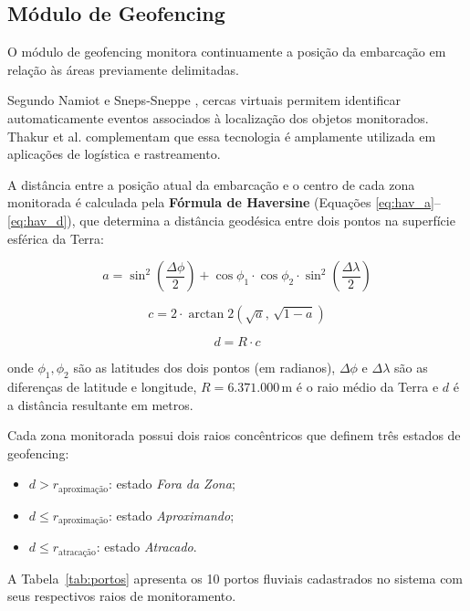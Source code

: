 \documentclass[12pt]{article}
\begin{document}
\subsection{Módulo de Geofencing}
O módulo de geofencing monitora continuamente a posição da embarcação em relação às áreas previamente delimitadas.

Segundo Namiot e Sneps-Sneppe \cite{namiot2013geofencing}, cercas virtuais permitem identificar automaticamente eventos associados à localização dos objetos monitorados. Thakur et al. \cite{thakur2020geofencing} complementam que essa tecnologia é amplamente utilizada em aplicações de logística e rastreamento.

A distância entre a posição atual da embarcação e o centro de cada zona monitorada é calculada pela \textbf{Fórmula de Haversine} (Equações \ref{eq:hav_a}--\ref{eq:hav_d}), que determina a distância geodésica entre dois pontos na superfície esférica da Terra:

\begin{equation}
\label{eq:hav_a}
a = \sin^2\!\left(\frac{\Delta\phi}{2}\right) + \cos\phi_1 \cdot \cos\phi_2 \cdot \sin^2\!\left(\frac{\Delta\lambda}{2}\right)
\end{equation}

\begin{equation}
\label{eq:hav_c}
c = 2 \cdot \arctan2\!\left(\sqrt{a},\, \sqrt{1 - a}\right)
\end{equation}

\begin{equation}
\label{eq:hav_d}
d = R \cdot c
\end{equation}

onde $\phi_1, \phi_2$ são as latitudes dos dois pontos (em radianos), $\Delta\phi$ e $\Delta\lambda$ são as diferenças de latitude e longitude, $R = 6.371.000\,\text{m}$ é o raio médio da Terra e $d$ é a distância resultante em metros.

Cada zona monitorada possui dois raios concêntricos que definem três estados de geofencing:

\begin{itemize}
\item $d > r_{\text{aproximação}}$: estado \textit{Fora da Zona};
\item $d \leq r_{\text{aproximação}}$: estado \textit{Aproximando};
\item $d \leq r_{\text{atracação}}$: estado \textit{Atracado}.
\end{itemize}

A Tabela~\ref{tab:portos} apresenta os 10 portos fluviais cadastrados no sistema com seus respectivos raios de monitoramento.
\end{document}
